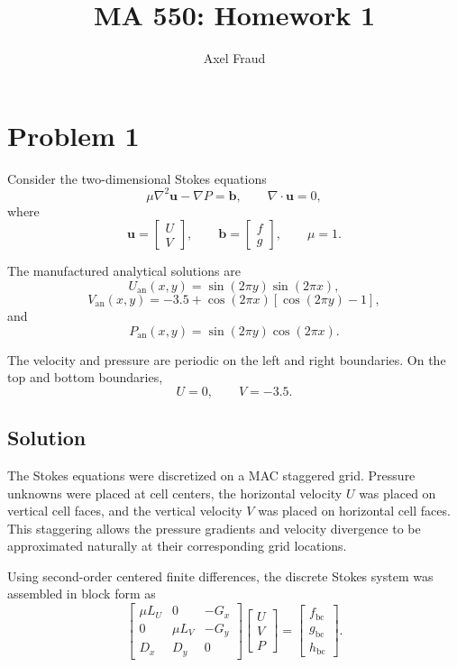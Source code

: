 \documentclass[12pt]{article}
\title{MA 550: Homework 1}
\author{Axel Fraud}
\date{}
\begin{document}
\maketitle


\section*{Problem 1}

Consider the two-dimensional Stokes equations
\[
\mu \nabla^2 \mathbf{u} - \nabla P = \mathbf{b},
\qquad
\nabla \cdot \mathbf{u} = 0,
\]
where
\[
\mathbf{u} =
\begin{bmatrix}
U \\ V
\end{bmatrix},
\qquad
\mathbf{b} =
\begin{bmatrix}
f \\ g
\end{bmatrix},
\qquad
\mu = 1.
\]

The manufactured analytical solutions are
\[
U_{\mathrm{an}}(x,y)
=
\sin(2\pi y)\sin(2\pi x),
\]
\[
V_{\mathrm{an}}(x,y)
=
-3.5
+
\cos(2\pi x)
\left[\cos(2\pi y)-1\right],
\]
and
\[
P_{\mathrm{an}}(x,y)
=
\sin(2\pi y)\cos(2\pi x).
\]

The velocity and pressure are periodic on the left and right boundaries. On
the top and bottom boundaries,
\[
U=0,
\qquad
V=-3.5.
\]

\subsection*{Solution}

The Stokes equations were discretized on a MAC staggered grid. Pressure
unknowns were placed at cell centers, the horizontal velocity $U$ was placed
on vertical cell faces, and the vertical velocity $V$ was placed on horizontal
cell faces. This staggering allows the pressure gradients and velocity
divergence to be approximated naturally at their corresponding grid
locations.

Using second-order centered finite differences, the discrete Stokes system
was assembled in block form as
\[
\begin{bmatrix}
\mu L_U & 0 & -G_x \\
0 & \mu L_V & -G_y \\
D_x & D_y & 0
\end{bmatrix}
\begin{bmatrix}
U \\ V \\ P
\end{bmatrix}
=
\begin{bmatrix}
f_{\mathrm{bc}} \\
g_{\mathrm{bc}} \\
h_{\mathrm{bc}}
\end{bmatrix}.
\]
\end{document}
